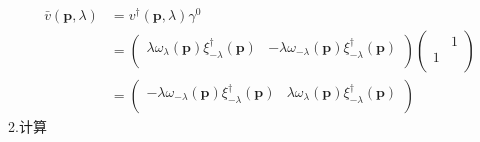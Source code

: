\begin{equation}
    \begin{aligned}
        \bar{v}\left( \mathbf{p},\lambda \right) &=v^{\dagger}\left( \mathbf{p},\lambda \right) \gamma ^0
\\
&=\left( \begin{matrix}
	\lambda \omega _{\lambda}\left( \mathbf{p} \right) \xi _{-\lambda}^{\dagger}\left( \mathbf{p} \right)&		-\lambda \omega _{-\lambda}\left( \mathbf{p} \right) \xi _{-\lambda}^{\dagger}\left( \mathbf{p} \right)\\
\end{matrix} \right) \left( \begin{matrix}
	&		1\\
	1&		\\
\end{matrix} \right) 
\\
&=\left( \begin{matrix}
	-\lambda \omega _{-\lambda}\left( \mathbf{p} \right) \xi _{-\lambda}^{\dagger}\left( \mathbf{p} \right)&		\lambda \omega _{\lambda}\left( \mathbf{p} \right) \xi _{-\lambda}^{\dagger}\left( \mathbf{p} \right)\\
\end{matrix} \right) 
    \end{aligned}
\end{equation}
2.计算
